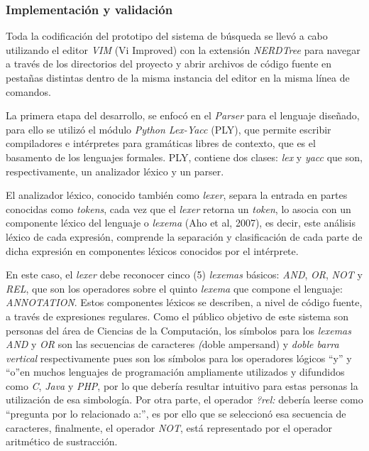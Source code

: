 \begin{itemize}
\subsubsection{Implementación y validación}
Toda la codificación del prototipo del sistema de búsqueda se llevó a cabo utilizando el editor \textit{VIM} (Vi Improved) con la extensión \textit{NERDTree} para navegar a través de los directorios del proyecto y abrir archivos de código fuente en pestañas distintas dentro de la misma instancia del editor en la misma línea de comandos.

La primera etapa del desarrollo, se enfocó en el \textit{Parser} para el lenguaje diseñado, para ello se utilizó el módulo \textit{Python Lex-Yacc} (PLY), que permite escribir compiladores e intérpretes para gramáticas libres de contexto, que es el basamento de los lenguajes formales. PLY, contiene dos clases: \textit{lex} y \textit{yacc} que son, respectivamente, un analizador léxico y un parser.

El analizador léxico, conocido también como \textit{lexer}, separa la entrada en partes conocidas como \textit{tokens}, cada vez que el \textit{lexer} retorna un \textit{token}, lo asocia con un componente léxico del lenguaje o \textit{lexema} (Aho et al, 2007), es decir, este análisis léxico de cada expresión, comprende la separación y clasificación de cada parte de dicha expresión en componentes léxicos conocidos por el intérprete.

En este caso, el \textit{lexer} debe reconocer cinco (5) \textit{lexemas} básicos: \textit{AND}, \textit{OR}, \textit{NOT} y \textit{REL}, que son los operadores sobre el quinto \textit{lexema} que compone el lenguaje: \textit{ANNOTATION}. Estos componentes léxicos se describen, a nivel de código fuente, a través de expresiones regulares. Como el público objetivo de este sistema son personas del área de Ciencias de la Computación, los símbolos para los \textit{lexemas} \textit{AND} y \textit{OR} son las secuencias de caracteres \textit(doble ampersand) y \textit{doble barra vertical} respectivamente pues son los símbolos para los operadores lógicos ``y'' y ``o''en muchos lenguajes de programación ampliamente utilizados y difundidos como \textit{C}, \textit{Java} y \textit{PHP}, por lo que debería resultar intuitivo para estas personas la utilización de esa simbología. Por otra parte, el operador \textit{?rel:} debería leerse como ``pregunta por lo relacionado a:'', es por ello que se seleccionó esa secuencia de caracteres, finalmente, el operador \textit{NOT}, está representado por el operador aritmético de sustracción.


\end{itemize}
